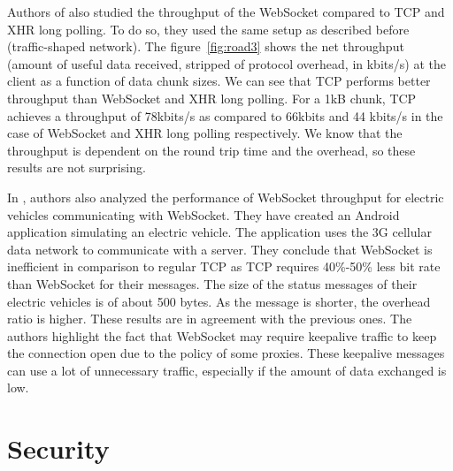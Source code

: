 \documentclass[10pt,journal,compsoc]{IEEEtran}
\newcommand{\ws}{WebSocket}
\begin{document}
Authors of \cite{roadblock} also studied the throughput of the \ws{} compared to TCP and XHR long polling.
To do so, they used the same setup as described before (traffic-shaped network).
The figure~\ref{fig:road3} shows the net throughput (amount of useful data received, stripped of protocol overhead, in kbits/s) at the client as a function of data chunk sizes.
We can see that TCP performs better throughput than \ws{} and XHR long polling.
For a 1kB chunk, TCP achieves a throughput of 78kbits/s as compared to 66kbits and 44 kbits/s in the case of \ws{} and XHR long polling respectively.
We know that the throughput is dependent on the round trip time and the overhead, so these results are not surprising.

In \cite{EV}, authors also analyzed the performance of \ws{} throughput for electric vehicles communicating with \ws{}.
They have created an Android application simulating an electric vehicle.
The application uses the 3G cellular data network to communicate with a server.
They conclude that \ws{} is inefficient in comparison to regular TCP as TCP requires 40\%-50\% less bit rate than \ws{} for their messages.
The size of the status messages of their electric vehicles is of about 500 bytes. 
As the message is shorter, the overhead ratio is higher.
These results are in agreement with the previous ones.
The authors highlight the fact that \ws{} may require keepalive traffic to keep the connection open due to the policy of some proxies. %
These keepalive messages can use a lot of unnecessary traffic, especially if the  amount of data exchanged is low. %


\section{Security}
\end{document}
